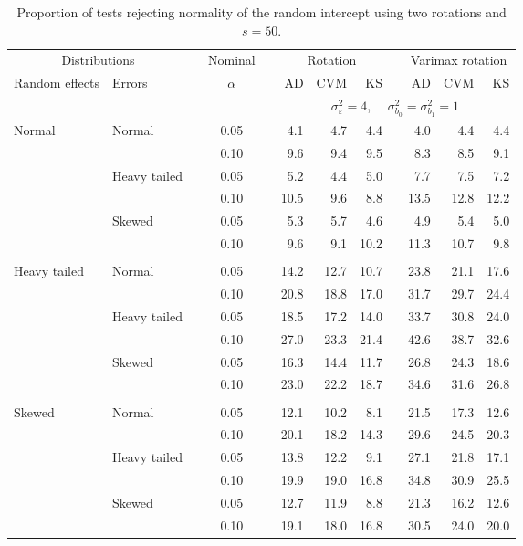 \begin{table}[ht]
\centering
\caption{\label{tab:fixedsimb050} Proportion of tests rejecting normality of the random intercept using two rotations and $s = 50$.}
\begin{scriptsize}
\begin{tabular}{ll p{.1cm} c p{.1cm} rrr p{.1cm} rrr}
  \hline
  \multicolumn{2}{c}{Distributions}& & Nominal & &  \multicolumn{3}{c}{Rotation} & & \multicolumn{3}{c}{Varimax rotation} \\ \cline{1-2} \cline{6-8} \cline{10-12}   
  Random effects & Errors & & $\alpha$ & & AD & CVM & KS & & AD & CVM & KS \\ 
   \hline
& && && \multicolumn{7}{c}{$\sigma_{\varepsilon}^2 = 4$, \ \ $\sigma_{b_0}^2 = \sigma_{b_1}^2 = 1$} \\ \cline{6-12}
\rowcolor{gray!20} Normal & Normal &  & 0.05 &  & 4.1 & 4.7 & 4.4 &  & 4.0 & 4.4 & 4.4 \\ 
\rowcolor{gray!20}    &  &  & 0.10 &  & 9.6 & 9.4 & 9.5 &  & 8.3 & 8.5 & 9.1 \\ 
\rowcolor{gray!20}    & Heavy tailed &  & 0.05 &  & 5.2 & 4.4 & 5.0 &  & 7.7 & 7.5 & 7.2 \\ 
\rowcolor{gray!20}    &  &  & 0.10 &  & 10.5 & 9.6 & 8.8 &  & 13.5 & 12.8 & 12.2 \\ 
\rowcolor{gray!20}    & Skewed &  & 0.05 &  & 5.3 & 5.7 & 4.6 &  & 4.9 & 5.4 & 5.0 \\ 
\rowcolor{gray!20}    &  &  & 0.10 &  & 9.6 & 9.1 & 10.2 &  & 11.3 & 10.7 & 9.8 \\ 
&&&&&&&&&&&\\
  Heavy tailed & Normal &  & 0.05 &  & 14.2 & 12.7 & 10.7 &  & 23.8 & 21.1 & 17.6 \\ 
   &  &  & 0.10 &  & 20.8 & 18.8 & 17.0 &  & 31.7 & 29.7 & 24.4 \\ 
   & Heavy tailed &  & 0.05 &  & 18.5 & 17.2 & 14.0 &  & 33.7 & 30.8 & 24.0 \\ 
   &  &  & 0.10 &  & 27.0 & 23.3 & 21.4 &  & 42.6 & 38.7 & 32.6 \\ 
   & Skewed &  & 0.05 &  & 16.3 & 14.4 & 11.7 &  & 26.8 & 24.3 & 18.6 \\ 
   &  &  & 0.10 &  & 23.0 & 22.2 & 18.7 &  & 34.6 & 31.6 & 26.8 \\ 
&&&&&&&&&&&\\
  Skewed & Normal &  & 0.05 &  & 12.1 & 10.2 & 8.1 &  & 21.5 & 17.3 & 12.6 \\ 
   &  &  & 0.10 &  & 20.1 & 18.2 & 14.3 &  & 29.6 & 24.5 & 20.3 \\ 
   & Heavy tailed &  & 0.05 &  & 13.8 & 12.2 & 9.1 &  & 27.1 & 21.8 & 17.1 \\ 
   &  &  & 0.10 &  & 19.9 & 19.0 & 16.8 &  & 34.8 & 30.9 & 25.5 \\ 
   & Skewed &  & 0.05 &  & 12.7 & 11.9 & 8.8 &  & 21.3 & 16.2 & 12.6 \\ 
   &  &  & 0.10 &  & 19.1 & 18.0 & 16.8 &  & 30.5 & 24.0 & 20.0 \\ 


\end{tabular}
\end{scriptsize}
\end{table}
